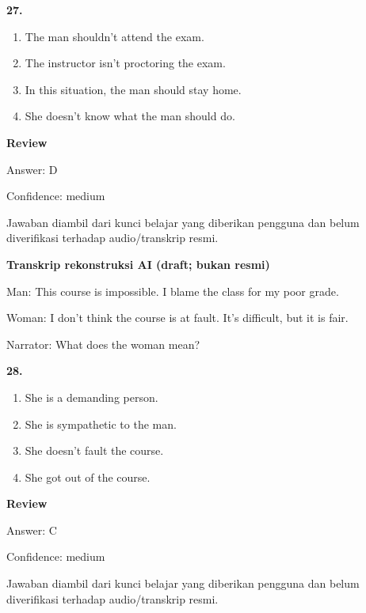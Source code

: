 \documentclass[12pt]{article}
\begin{document}
\noindent\textbf{27.}
\begin{enumerate}[label=(\Alph*),leftmargin=*,itemsep=0.2em]
\item The man shouldn't attend the exam.
\item The instructor isn't proctoring the exam.
\item In this situation, the man should stay home.
\item She doesn't know what the man should do.
\end{enumerate}
\par
\begingroup
\setlength{\parskip}{0pt}
\setlength{\parindent}{0pt}
\textbf{Review}\par
Answer: D\par
Confidence: medium\par
Jawaban diambil dari kunci belajar yang diberikan pengguna dan belum diverifikasi terhadap audio/transkrip resmi.\par
\endgroup
\par
\vspace{0.25\baselineskip}
\begin{exampleblock}
\textbf{Transkrip rekonstruksi AI (draft; bukan resmi)}\par
Man: This course is impossible. I blame the class for my poor grade.\par
Woman: I don't think the course is at fault. It's difficult, but it is fair.\par
Narrator: What does the woman mean?\par
\end{exampleblock}
\noindent\textbf{28.}
\begin{enumerate}[label=(\Alph*),leftmargin=*,itemsep=0.2em]
\item She is a demanding person.
\item She is sympathetic to the man.
\item She doesn't fault the course.
\item She got out of the course.
\end{enumerate}
\par
\begingroup
\setlength{\parskip}{0pt}
\setlength{\parindent}{0pt}
\textbf{Review}\par
Answer: C\par
Confidence: medium\par
Jawaban diambil dari kunci belajar yang diberikan pengguna dan belum diverifikasi terhadap audio/transkrip resmi.\par
\endgroup
\par
\end{document}
